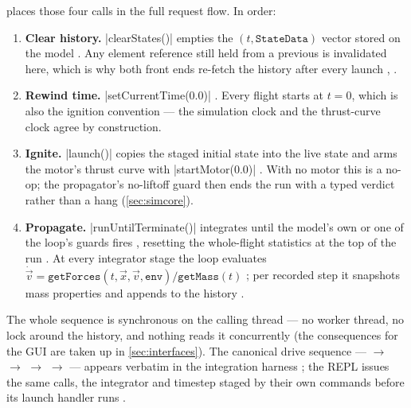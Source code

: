  places those four calls in the full request flow. In order:

\begin{enumerate}
\item \textbf{Clear history.} \cppinline|clearStates()| empties the
  $(t, \mathtt{StateData})$ vector stored on the model . Any
  element reference still held from a previous  is invalidated here, which is
  why both front ends re-fetch the history after every launch
  , .
\item \textbf{Rewind time.} \cppinline|setCurrentTime(0.0)| .
  Every flight starts at $t = 0$, which is also the ignition convention --- the simulation
  clock and the thrust-curve clock agree by construction.
\item \textbf{Ignite.} \cppinline|launch()| copies the staged initial state into the live
  state and arms the motor's thrust curve with \cppinline|startMotor(0.0)|
  . With no motor this is a no-op; the propagator's
  no-liftoff guard then ends the run with a typed verdict rather than a hang
  (\cref{sec:simcore}).
\item \textbf{Propagate.} \cppinline|runUntilTerminate()| integrates until the model's own
   or one of the loop's guards fires ,
  resetting the whole-flight statistics at the top of the run .
  At every integrator stage the loop evaluates
  $\dot{\vec v} = \mathtt{getForces}(t, \vec x, \vec v, \mathtt{env}) /
  \mathtt{getMass}(t)$ ; per recorded step it snapshots mass
  properties and appends to the history .
\end{enumerate}

The whole sequence is synchronous on the calling thread --- no worker thread, no lock
around the history, and nothing reads it concurrently (the consequences for the GUI are
taken up in \cref{sec:interfaces}). The canonical drive sequence ---
 $\to$  $\to$  $\to$
 $\to$  --- appears verbatim in the integration
harness ; the REPL issues the same calls, the
integrator and timestep staged by their own commands before its launch handler runs
.

